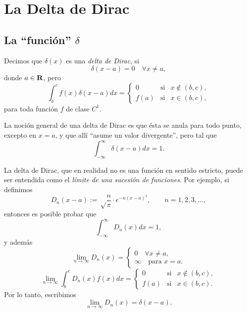 \chapter{La Delta de Dirac}\label{app:Dirac}
\section{La ``función'' $\delta$}
Decimos que $\delta(x)$ es una \textit{delta de Dirac}, si
\begin{equation}
\delta (x-a) = 0\quad \forall x\not = a,
\end{equation}
donde $a\in {\bf R}$, pero
\begin{equation}
\int_b^cf(x)\delta(x-a) d x = \left\{\begin{array}{ccl}
 0 & \text{si} & x\notin (b,c) ,\\
f(a)& \text{si} & x\in (b,c) ,
\end{array}\right.
\end{equation}
para toda función $f$ de clase $C^1$.

 La noción general de una delta de Dirac es que ésta se anula para todo punto,
excepto en $x=a$, y que allí ``asume un valor divergente'', pero tal que
\begin{equation}
  \int_{-\infty}^{\infty}\delta(x-a)d x = 1.
 \end{equation}
 
 La delta de Dirac, que en realidad no es una función en sentido estricto,
puede ser entendida como el \textit{límite de una sucesión de funciones}.
Por ejemplo, si definimos
\begin{equation}
  D_n(x-a) := \sqrt\frac n\pi\cdot e^{-n(x-a)^2}, \qquad n=1,2,3,\dots,
\end{equation}
entonces es posible probar que
\begin{equation}
\int_{-\infty}^{\infty}D_n(x) d x =  1,
\end{equation}
y además
\begin{equation}
\lim_{n\to\infty} D_n(x) =  \left\{\begin{array}{l}0 \quad \forall x\neq
a,\\\infty \quad \text{para }      x=a.\end{array}\right.
\end{equation}
\begin{equation}
\lim_{n\to\infty}\int_b^cD_n(x)f(x)d x = \left\{\begin{array}{ccl}
 0 & \text{si} & x\notin (b,c) ,\\
f(a)& \text{si} & x\in (b,c) .
\end{array}\right.
\end{equation}
Por lo tanto, escribimos
\begin{equation}
  \lim_{n\to\infty}D_n(x)=\delta(x-a).
 \end{equation}
 
